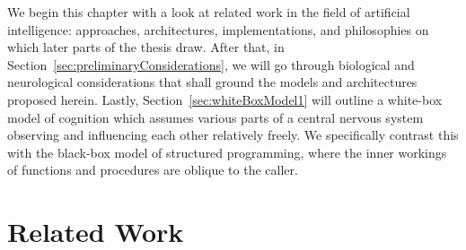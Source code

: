 We begin this chapter with a look at related work in the field of artificial intelligence: approaches, architectures, implementations, and philosophies on which later parts of the thesis draw. After that, in Section~\ref{sec:preliminaryConsiderations}, we will go through biological and neurological considerations that shall ground the models and architectures proposed herein. Lastly, Section~\ref{sec:whiteBoxModel1} will outline a white-box model of cognition which assumes various parts of a central nervous system observing and influencing each other relatively freely. We specifically contrast this with the black-box model of structured programming, where the inner workings of functions and procedures are oblique to the caller.

\section{Related Work}


